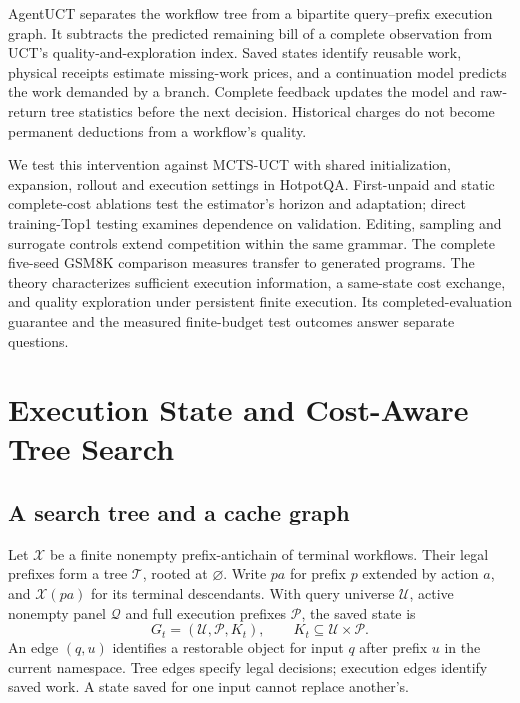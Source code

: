 AgentUCT separates the workflow tree from a bipartite query--prefix execution
graph. It subtracts the predicted remaining bill of a complete observation
from UCT's quality-and-exploration index. Saved states identify reusable work,
physical receipts estimate missing-work prices, and a continuation model
predicts the work demanded by a branch. Complete feedback updates the model
and raw-return tree statistics before the next decision. Historical charges
do not become permanent deductions from a workflow's quality.

We test this intervention against MCTS-UCT with shared initialization,
expansion, rollout and execution settings in HotpotQA. First-unpaid and static
complete-cost ablations test the estimator's horizon and adaptation; direct
training-Top1 testing examines dependence on validation. Editing, sampling
and surrogate controls extend competition within the same grammar. The complete
five-seed GSM8K comparison measures transfer to generated programs. The theory characterizes sufficient execution information,
a same-state cost exchange, and quality exploration under persistent finite
execution. Its completed-evaluation guarantee and the measured finite-budget
test outcomes answer separate questions.

\section{Execution State and Cost-Aware Tree Search}
\label{sec:setting}
\subsection{A search tree and a cache graph}
Let $\mathcal X$ be a finite nonempty prefix-antichain of terminal workflows.
Their legal prefixes form a tree $\mathcal T$, rooted at $\varnothing$.
Write $pa$ for prefix $p$ extended by action $a$, and $\mathcal X(pa)$ for
its terminal descendants. With query universe $\mathcal U$, active nonempty
panel $\mathcal Q$ and full execution prefixes $\mathcal P$, the saved state is
\begin{equation}
G_t=(\mathcal U,\mathcal P,K_t),\qquad K_t\subseteq\mathcal U\times\mathcal P.
\label{eq:graph}
\end{equation}
An edge $(q,u)$ identifies a restorable object for input $q$ after prefix $u$
in the current namespace. Tree edges specify legal decisions; execution edges
identify saved work. A state saved for one input cannot replace another's.

